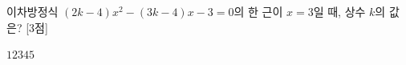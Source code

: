 이차방정식 $(2k-4)x^2-(3k-4)x-3=0$의 한 근이 $x=3$일 때, 상수 $k$의 값은? \mbox{[3점]}
\begin{choices32}{$1$}{$2$}{$3$}{$4$}{$5$}\end{choices32}
